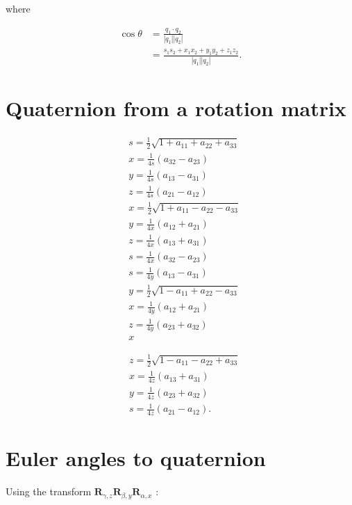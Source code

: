 \documentclass[10pt]{article}
\begin{document}
where

$$
\begin{aligned}
\cos \theta & =\frac{q_{1} \cdot q_{2}}{\left|q_{1}\right|\left|q_{2}\right|} \\
& =\frac{s_{1} s_{2}+x_{1} x_{2}+y_{1} y_{2}+z_{1} z_{2}}{\left|q_{1}\right|\left|q_{2}\right|} .
\end{aligned}
$$

\section{Quaternion from a rotation matrix}
$$
\begin{aligned}
& s=\frac{1}{2} \sqrt{1+a_{11}+a_{22}+a_{33}} \\
& x=\frac{1}{4 s}\left(a_{32}-a_{23}\right) \\
& y=\frac{1}{4 s}\left(a_{13}-a_{31}\right) \\
& z=\frac{1}{4 s}\left(a_{21}-a_{12}\right) \\
& x=\frac{1}{2} \sqrt{1+a_{11}-a_{22}-a_{33}} \\
& y=\frac{1}{4 x}\left(a_{12}+a_{21}\right) \\
& z=\frac{1}{4 x}\left(a_{13}+a_{31}\right) \\
& s=\frac{1}{4 x}\left(a_{32}-a_{23}\right) \\
& s=\frac{1}{4 y}\left(a_{13}-a_{31}\right) \\
& y=\frac{1}{2} \sqrt{1-a_{11}+a_{22}-a_{33}} \\
& x=\frac{1}{4 y}\left(a_{12}+a_{21}\right) \\
& z=\frac{1}{4 y}\left(a_{23}+a_{32}\right) \\
& x
\end{aligned}
$$

$$
\begin{aligned}
& z=\frac{1}{2} \sqrt{1-a_{11}-a_{22}+a_{33}} \\
& x=\frac{1}{4 z}\left(a_{13}+a_{31}\right) \\
& y=\frac{1}{4 z}\left(a_{23}+a_{32}\right) \\
& s=\frac{1}{4 z}\left(a_{21}-a_{12}\right) .
\end{aligned}
$$

\section{Euler angles to quaternion}
Using the transform $\mathbf{R}_{\gamma, z} \mathbf{R}_{\beta, y} \mathbf{R}_{\alpha, x}$ :
\end{document}
